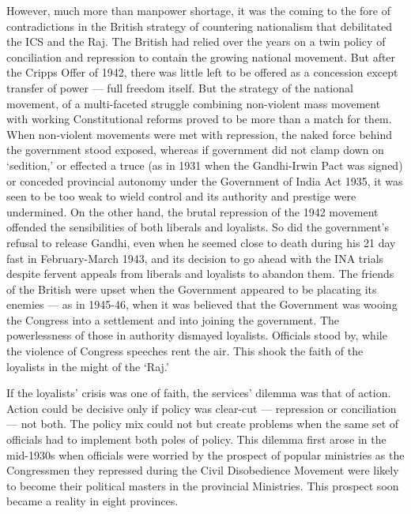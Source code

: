 However, much more than manpower shortage, it was the coming to the fore of contradictions in the British strategy of countering nationalism that debilitated the ICS and the Raj. The British had relied over the years on a twin policy of conciliation and repression to contain the growing national movement. But after the Cripps Offer of 1942, there was little left to be offered as a concession except transfer of power — full freedom itself. But the strategy of the national movement, of a multi-faceted struggle combining non-violent mass movement with working Constitutional reforms proved to be more than a match for them. When non-violent movements were met with repression, the naked force behind the government stood exposed, whereas if government did not clamp down on `sedition,' or effected a truce (as in 1931 when the Gandhi-Irwin Pact was signed) or conceded provincial autonomy under the Government of India Act 1935, it was seen to be too weak to wield control and its authority and prestige were undermined. On the other hand, the brutal repression of the 1942 movement offended the sensibilities of both liberals and loyalists. So did the government's refusal to release Gandhi, even when he seemed close to death during his 21 day fast in February-March 1943, and its decision to go ahead with the INA trials despite fervent appeals from liberals and loyalists to abandon them. The friends of the British were upset when the Government appeared to be placating its enemies — as in 1945-46, when it was believed that the Government was wooing the Congress into a settlement and into joining the government. The powerlessness of those in authority dismayed loyalists. Officials stood by, while the violence of Congress speeches rent the air. This shook the faith of the loyalists in the might of the `Raj.' 

If the loyalists' crisis was one of faith, the services' dilemma was that of action. Action could be decisive only if policy was clear-cut — repression or conciliation — not both. The policy mix could not but create problems when the same set of officials had to implement both poles of policy. This dilemma first arose in the mid-1930s when officials were worried by the prospect of popular ministries as the Congressmen they repressed during the Civil Disobedience Movement were likely to become their political masters in the provincial Ministries. This prospect soon became a reality in eight provinces. 

